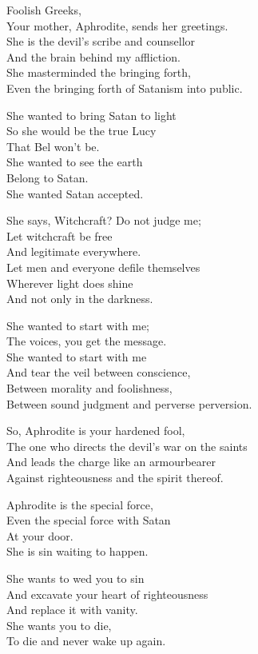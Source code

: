 \documentclass[
]{book}
\begin{document}
Foolish Greeks,\\
Your mother, Aphrodite, sends her greetings.\\
She is the devil's scribe and counsellor\\
And the brain behind my affliction.\\
She masterminded the bringing forth,\\
Even the bringing forth of Satanism into public.

She wanted to bring Satan to light\\
So she would be the true Lucy\\
That Bel won't be.\\
She wanted to see the earth\\
Belong to Satan.\\
She wanted Satan accepted.

She says, Witchcraft? Do not judge me;\\
Let witchcraft be free\\
And legitimate everywhere.\\
Let men and everyone defile themselves\\
Wherever light does shine\\
And not only in the darkness.

She wanted to start with me;\\
The voices, you get the message.\\
She wanted to start with me\\
And tear the veil between conscience,\\
Between morality and foolishness,\\
Between sound judgment and perverse perversion.

So, Aphrodite is your hardened fool,\\
The one who directs the devil's war on the saints\\
And leads the charge like an armourbearer\\
Against righteousness and the spirit thereof.

Aphrodite is the special force,\\
Even the special force with Satan\\
At your door.\\
She is sin waiting to happen.

She wants to wed you to sin\\
And excavate your heart of righteousness\\
And replace it with vanity.\\
She wants you to die,\\
To die and never wake up again.
\end{document}

